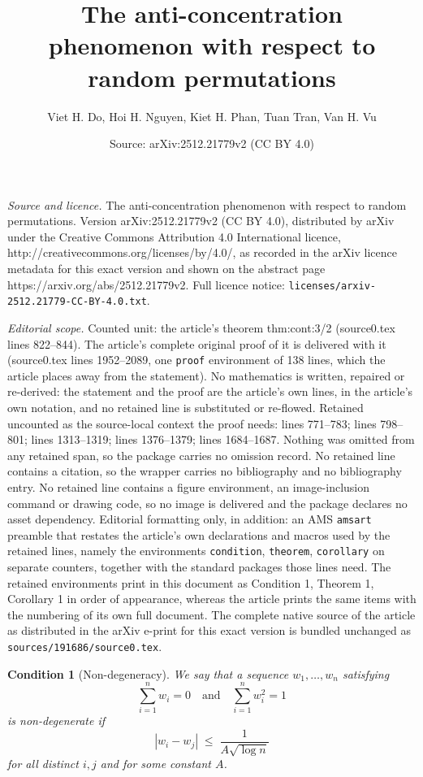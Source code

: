 \documentclass[10pt,a4paper]{amsart}
\title{The anti-concentration phenomenon with respect to random permutations}
\author{Viet H. Do, Hoi H. Nguyen, Kiet H. Phan, Tuan Tran, Van H. Vu}
\date{Source: arXiv:2512.21779v2 (CC BY 4.0)}
\newtheorem{condition}{Condition}
\begin{document}
\maketitle

\noindent\emph{Source and licence.} The anti-concentration phenomenon with respect to random permutations. Version arXiv:2512.21779v2 (CC BY 4.0), distributed by arXiv under the Creative Commons Attribution 4.0 International licence, http://creativecommons.org/licenses/by/4.0/, as recorded in the arXiv licence metadata for this exact version and shown on the abstract page https://arxiv.org/abs/2512.21779v2. Full licence notice: \texttt{licenses/arxiv-2512.21779-CC-BY-4.0.txt}.\par\smallskip

\noindent\textit{Editorial scope.} Counted unit: the article's theorem thm:cont:3/2 (source0.tex lines 822--844). The article's complete original proof of it is delivered with it (source0.tex lines 1952--2089, one \texttt{proof} environment of 138 lines, which the article places away from the statement). No mathematics is written, repaired or re-derived: the statement and the proof are the article's own lines, in the article's own notation, and no retained line is substituted or re-flowed.  Retained uncounted as the source-local context the proof needs: lines 771--783; lines 798--801; lines 1313--1319; lines 1376--1379; lines 1684--1687.  Nothing was omitted from any retained span, so the package carries no omission record.  No retained line contains a citation, so the wrapper carries no bibliography and no bibliography entry.  No retained line contains a figure environment, an image-inclusion command or drawing code, so no image is delivered and the package declares no asset dependency.  Editorial formatting only, in addition: an AMS \texttt{amsart} preamble that restates the article's own declarations and macros used by the retained lines, namely the environments \texttt{condition}, \texttt{theorem}, \texttt{corollary} on separate counters, together with the standard packages those lines need.  The retained environments print in this document as Condition 1, Theorem 1, Corollary 1 in order of appearance, whereas the article prints the same items with the numbering of its own full document.  The complete native source of the article as distributed in the arXiv e-print for this exact version is bundled unchanged as \texttt{sources/191686/source0.tex}.
\begin{condition}[Non-degeneracy]\label{cond:separation}
We say that a sequence $w_1,\dots,w_n$ satisfying
\[
\sum_{i=1}^n w_i = 0
\quad\text{and}\quad
\sum_{i=1}^n w_i^2 = 1
\]
is \emph{non-degenerate} if
\begin{equation}\label{eqn:separation}
|w_i-w_j| \;\le\; \frac{1}{A\sqrt{\log n}}
\end{equation}
for all distinct $i,j$ and for some constant $A$.
\end{condition}
\end{document}
